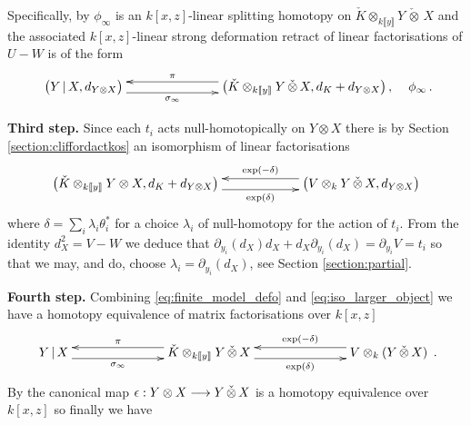 \documentclass[english,letter paper,12pt,leqno]{article}
\theoremstyle{example}
\numberwithin{equation}{section}
\begin{document}
Specifically, by \cite[Proposition 7.1]{dm1102.2957} $\phi_\infty$ is an $k[x,z]$-linear splitting homotopy on $\check{K} \otimes_{k\llbracket y \rrbracket} Y \,\check{\otimes}\, X$ and the associated $k[x,z]$-linear strong deformation retract of linear factorisations of $U - W$ is of the form
\begin{equation}\label{eq:finite_model_defo}
\xymatrix@C+4pc{
\big( Y \l X, d_{Y \otimes X} \big) \ar@<-1ex>[r]_-{\sigma_\infty} & \big( \check{K} \otimes_{k\llbracket y \rrbracket} Y \,\check{\otimes}\, X, d_K + d_{Y \otimes X} \big)\,, \ar@<-1ex>[l]_-{\pi}
} \quad \phi_\infty\,.
\end{equation}

\textbf{Third step.} Since each $t_i$ acts null-homotopically on $Y \otimes X$ there is by Section \ref{section:cliffordactkos} an isomorphism of linear factorisations
\begin{equation}\label{eq:iso_larger_object}
\xymatrix@C+3pc{ \big( \check{K} \otimes_{k\llbracket y \rrbracket} Y \otimes X, d_K + d_{Y \otimes X} \big) \ar@<-1ex>[r]_-{ \exp(\delta) } & \big( V \otimes_k Y \,\check{\otimes}\, X, d_{Y \otimes X} \big)\ar@<-1ex>[l]_-{ \exp(-\delta) } }
\end{equation}
where $\delta = \sum_i \lambda_i \theta_i^*$ for a choice $\lambda_i$ of null-homotopy for the action of $t_i$. From the identity $d^2_X = V - W$ we deduce that $\partial_{y_i}(d_X) d_X + d_X \partial_{y_i}(d_X) = \partial_{y_i} V = t_i$ so that we may, and do, choose $\lambda_i = \partial_{y_i}(d_X)$, see Section \ref{section:partial}.

\vspace{0.3cm}

\textbf{Fourth step.} Combining \eqref{eq:finite_model_defo} and \eqref{eq:iso_larger_object} we have a homotopy equivalence of matrix factorisations over $k[x,z]$
\begin{equation}\label{eq:final_finite_model2}
\xymatrix@C+4pc{
Y \l X \ar@<-1ex>[r]_-{\sigma_\infty} & \check{K} \otimes_{k\llbracket y \rrbracket} Y \,\check{\otimes}\, X \ar@<-1ex>[l]_-{\pi} \ar@<-1ex>[r]_-{ \exp(\delta) } & V \otimes_k ( Y \,\check{\otimes}\, X ) \ar@<-1ex>[l]_-{ \exp(-\delta) }
}\,.
\end{equation}
By \cite[Remark 7.7]{dm1102.2957} the canonical map $\epsilon: Y \otimes X \longrightarrow Y \,\check{\otimes}\, X$ is a homotopy equivalence over $k[x,z]$ so finally we have
\end{document}
